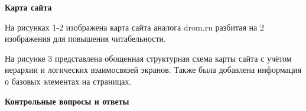 \textbf{Карта сайта}
\bigskip

На рисунках 1-2 изображена карта сайта аналога drom.ru разбитая на 2 изображения для повышения читабельности.
\bigskip

\noindent
\begin{minipage}{\linewidth}
\end{minipage}
\bigskip

\noindent
\begin{minipage}{\linewidth}
\end{minipage}
\bigskip

На рисунке 3 представлена обощенная структурная схема карты сайта с учётом иерархии и логических взаимосвязей экранов. Также была добавлена информация о базовых элементах на страницах.

\noindent
\begin{minipage}{\linewidth}
\end{minipage}
\bigskip

\textbf{Контрольные вопросы и ответы}

